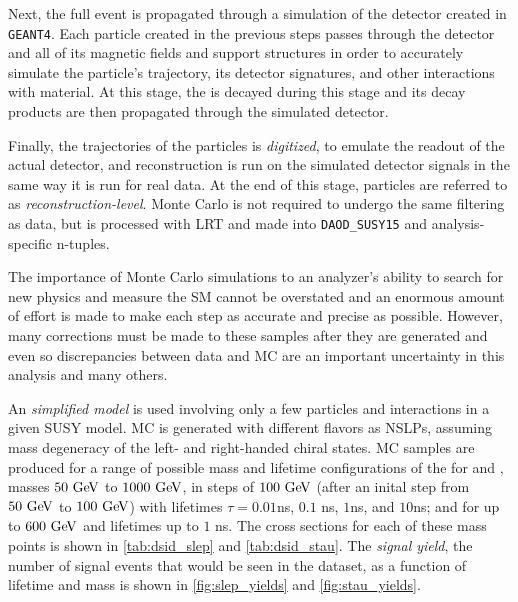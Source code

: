 Next, the full event is propagated through a simulation of the detector created in \texttt{GEANT4}. Each particle created in the previous steps passes through the detector and all of its magnetic fields and support structures in order to accurately simulate the particle's trajectory, its detector signatures, and other interactions with material. At this stage, the \slep is decayed during this stage and its decay products are then propagated through the simulated detector. 

Finally, the trajectories of the particles is \emph{digitized}, to emulate the readout of the actual detector, and reconstruction is run on the simulated detector signals in the same way it is run for real data. At the end of this stage, particles are referred to as \emph{reconstruction-level}. Monte Carlo is not required to undergo the same filtering as data, but is processed with \ac{LRT} and made into \texttt{DAOD\_SUSY15} and analysis-specific n-tuples.  

The importance of Monte Carlo simulations to an analyzer's ability to search for new physics and measure the \ac{SM} cannot be overstated and an enormous amount of effort is made to make each step as accurate and precise as possible. However, many corrections must be made to these samples after they are generated and even so discrepancies between data and \ac{MC} are an important uncertainty in this analysis and many others.

An \emph{simplified model} is used involving only a few particles and interactions in a given \ac{SUSY} model. \ac{MC} is generated with different \slep flavors as \acp{NSLP}, assuming mass degeneracy of the left- and right-handed chiral states. \ac{MC} samples are produced for a range of possible mass and lifetime configurations of the \slep for \selec and \smu, masses $50 \GeV$ to $1000 \GeV$, in steps of $100 \GeV$ (after an inital step from $50 \GeV$ to $100 \GeV$) with lifetimes $\tau = 0.01$ns, $0.1$ ns, $1$ns, and $10$ns; and for \stau up to $600 \GeV$ and lifetimes up to $1$ ns.  The cross sections for each of these mass points is shown in \autoref{tab:dsid_slep} and \autoref{tab:dsid_stau}. The \emph{signal yield}, the number of signal events that would be seen in the dataset, as a function of \slep lifetime and mass is shown in \autoref{fig:slep_yields} and \autoref{fig:stau_yields}.

